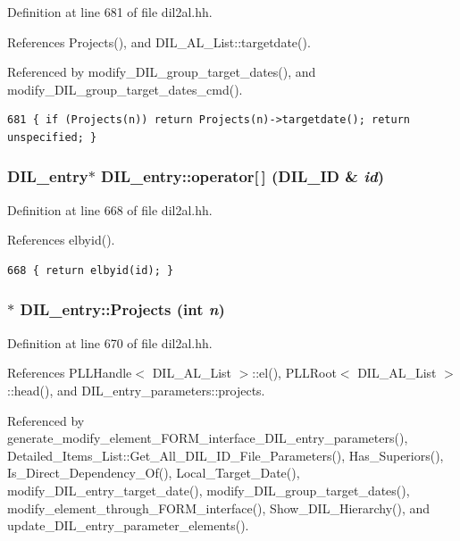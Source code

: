 Definition at line 681 of file dil2al.hh.

References Projects(), and DIL\_\-AL\_\-List::targetdate().

Referenced by modify\_\-DIL\_\-group\_\-target\_\-dates(), and modify\_\-DIL\_\-group\_\-target\_\-dates\_\-cmd().



\footnotesize\begin{verbatim}681 { if (Projects(n)) return Projects(n)->targetdate(); return unspecified; }
\end{verbatim}\normalsize 
{}
\subsubsection{\setlength{\rightskip}{0pt plus 5cm}DIL\_\-entry$\ast$ DIL\_\-entry::operator[$\,$] ({\bf DIL\_\-ID} \& {\em id})\hspace{0.3cm}{\tt  [inline]}}\label{classDIL__entry_a5}




Definition at line 668 of file dil2al.hh.

References elbyid().



\footnotesize\begin{verbatim}668 { return elbyid(id); }
\end{verbatim}\normalsize 
{}
\subsubsection{$\ast$ DIL\_\-entry::Projects (int {\em n})\hspace{0.3cm}{\tt  [inline]}}\label{classDIL__entry_a7}




Definition at line 670 of file dil2al.hh.

References PLLHandle$<$ DIL\_\-AL\_\-List $>$::el(), PLLRoot$<$ DIL\_\-AL\_\-List $>$::head(), and DIL\_\-entry\_\-parameters::projects.

Referenced by generate\_\-modify\_\-element\_\-FORM\_\-interface\_\-DIL\_\-entry\_\-parameters(), Detailed\_\-Items\_\-List::Get\_\-All\_\-DIL\_\-ID\_\-File\_\-Parameters(), Has\_\-Superiors(), Is\_\-Direct\_\-Dependency\_\-Of(), Local\_\-Target\_\-Date(), modify\_\-DIL\_\-entry\_\-target\_\-date(), modify\_\-DIL\_\-group\_\-target\_\-dates(), modify\_\-element\_\-through\_\-FORM\_\-interface(), Show\_\-DIL\_\-Hierarchy(), and update\_\-DIL\_\-entry\_\-parameter\_\-elements().



